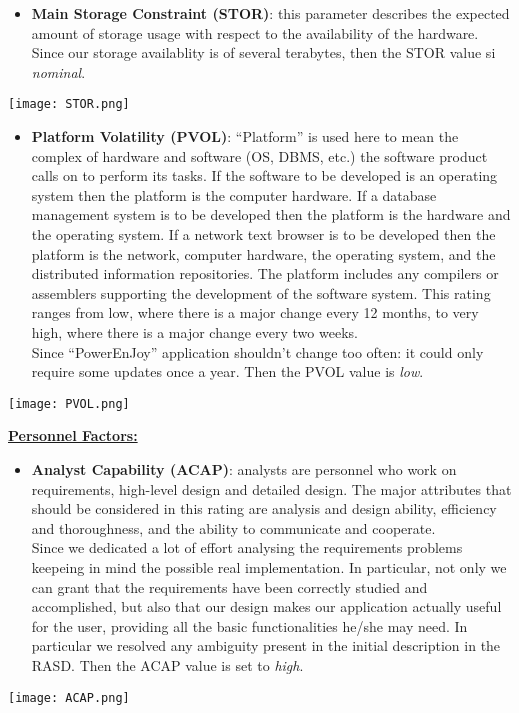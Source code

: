 \begin{itemize}
	\item \textbf{Main Storage Constraint (STOR)}: this parameter describes the expected amount of storage usage with respect to the availability of the hardware. Since our storage availablity is of several terabytes, then the STOR value si \textit{nominal}.
\end{itemize}
\begin{center}
	\texttt{[image: STOR.png]}
\end{center}

\begin{itemize}
	\item \textbf{Platform Volatility (PVOL)}: ``Platform'' is used here to mean the complex of hardware and software (OS, DBMS, etc.) the software product calls on to perform its tasks. If the software to be developed is an operating system then the platform is the computer hardware. If a database management system is to be	developed then the platform is the hardware and the operating system. If a network text browser is to be developed then the platform is the network, computer hardware, the operating system, and the distributed information repositories. The platform includes any compilers or assemblers	supporting the development of the software system. This rating ranges from low, where there is	a major change every 12 months, to very high, where there is a major change every two weeks. \\ Since ``PowerEnJoy'' application shouldn't change too often: it could only require some updates once a year. Then the PVOL value is \textit{low}.
\end{itemize}
\begin{center}
	\texttt{[image: PVOL.png]}
\end{center}
\textbf{\underline{Personnel Factors:}}

\begin{itemize}
	\item \textbf{Analyst Capability (ACAP)}: analysts are personnel who work on requirements, high-level design and detailed design.	The major attributes that should be considered in this rating are analysis and design ability,	efficiency and thoroughness, and the ability to communicate and cooperate. \\ Since we dedicated a lot of effort analysing the requirements problems keepeing in mind the possible real implementation. In particular, not only we can grant that the requirements have been correctly studied and accomplished, but also that our
	design makes our application actually useful for the user, providing all the basic functionalities he/she may need. In particular we resolved any ambiguity present in the initial description in the RASD. Then the ACAP value is set to \textit{high}.
\end{itemize}
\begin{center}
	\texttt{[image: ACAP.png]}
\end{center}	

